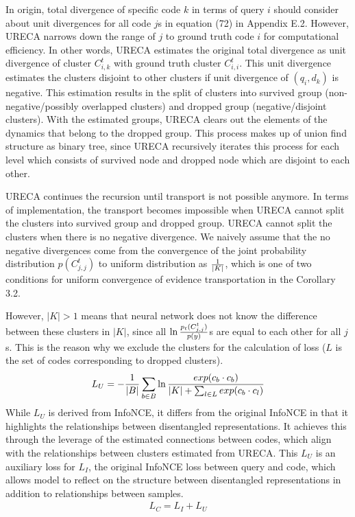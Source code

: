 In origin, total divergence of specific code $k$ in terms of query $i$ should consider 
about unit divergences for all code $j$s in equation (72) in Appendix E.2.
However, URECA narrows down the range of $j$ to ground truth code $i$ for computational efficiency.
In other words, URECA estimates the original total divergence as unit divergence of cluster $C^t_{i,k}$ with 
ground truth cluster $C^t_{i,i}$.
This unit divergence estimates the clusters disjoint to other clusters if unit divergence of $(q_i,d_k)$ is negative. 
This estimation results in the split of clusters into survived group (non-negative/possibly overlapped clusters) 
and dropped group (negative/disjoint clusters).
With the estimated groups, URECA clears out the elements of the dynamics that belong to the dropped group.
This process makes up of union find structure as binary tree, 
since URECA recursively iterates this process for each level which consists of survived node and dropped node 
which are disjoint to each other. 

URECA continues the recursion until transport is not possible anymore.
In terms of implementation, the transport becomes impossible when URECA cannot split the clusters into survived group 
and dropped group.
URECA cannot split the clusters when there is no negative divergence.
We naively assume that the no negative divergences come from the convergence of the joint probability distribution $p(C^t_{j,j})$ 
to uniform distribution as ${1 \over |K|}$, 
which is one of two conditions for uniform convergence of evidence transportation in the Corollary 3.2. 

However, $|K| > 1$ means that neural network does not know the difference between these clusters in $|K|$, 
since all $\ln {p_t(C^t_{j,j}) \over p(y)}$s are equal to each other for all $j$s.
This is the reason why we exclude the clusters for the calculation of loss ($L$ is the set of codes corresponding to dropped clusters).
\begin{align}
\label{URECA_loss}
\begin{split}
L_U= -{1 \over |B|}\sum_{b \in B}\ln{ exp(c_b \cdot c_b)\over |K| + \sum_{l \in L}exp(c_b\cdot c_l)}
\end{split}
\end{align}
While $L_U$ is derived from InfoNCE, it differs from the original InfoNCE in that it highlights the relationships between disentangled representations. 
It achieves this through the leverage of the estimated connections between codes, 
which align with the relationships between clusters estimated from URECA.
This $L_U$ is an auxiliary loss for $L_I$, the original InfoNCE loss between query and code,
which allows model to reflect on the structure between disentangled representations in addition to relationships between samples.
\begin{equation}
\label{combined_loss}
\begin{split}
L_{C}=L_{I} + L_{U} 
\end{split}
\end{equation}
